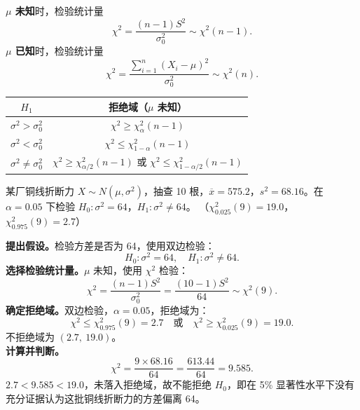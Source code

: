 ﻿\documentclass[lang=cn,11pt]{elegantbook}
\begin{document}
\begin{property}[$\chi^2$ 检验]\label{prop:chi2-test}
\textbf{\(\mu\) 未知}时，检验统计量
\[
\chi^2 = \frac{(n-1)S^2}{\sigma_0^2} \sim \chi^2(n-1).
\]
\textbf{\(\mu\) 已知}时，检验统计量
\[
\chi^2 = \frac{\sum_{i=1}^{n}(X_i-\mu)^2}{\sigma_0^2} \sim \chi^2(n).
\]
\begin{center}
\begin{tabular}{cc}
\toprule
\(H_1\) & 拒绝域（\(\mu\) 未知） \\
\midrule
\(\sigma^2 > \sigma_0^2\) & \(\chi^2 \geq \chi^2_\alpha(n-1)\) \\[4pt]
\(\sigma^2 < \sigma_0^2\) & \(\chi^2 \leq \chi^2_{1-\alpha}(n-1)\) \\[4pt]
\(\sigma^2 \neq \sigma_0^2\) & \(\chi^2 \geq \chi^2_{\alpha/2}(n-1)\) 或 \(\chi^2 \leq \chi^2_{1-\alpha/2}(n-1)\) \\
\bottomrule
\end{tabular}
\end{center}
\end{property}

\begin{exercise}\label{exer:9-chi2-two}
某厂铜线折断力 \(X \sim N(\mu, \sigma^2)\)，抽查 10 根，\(\overline{x}=575.2\)，\(s^2=68.16\)。在 \(\alpha=0.05\) 下检验 \(H_0\colon \sigma^2=64\)，\(H_1\colon \sigma^2\neq64\)。
（\(\chi^2_{0.025}(9)=19.0\)，\(\chi^2_{0.975}(9)=2.7\)）
\end{exercise}
\begin{solution}
\textbf{提出假设。}检验方差是否为 64，使用双边检验：
\[
H_0\colon \sigma^2 = 64,\quad H_1\colon \sigma^2 \neq 64.
\]
\textbf{选择检验统计量。}\(\mu\) 未知，使用 \(\chi^2\) 检验：
\[
\chi^2 = \frac{(n-1)S^2}{\sigma_0^2} = \frac{(10-1)S^2}{64} \sim \chi^2(9).
\]
\textbf{确定拒绝域。}双边检验，\(\alpha=0.05\)，拒绝域为：
\[
\chi^2 \leq \chi^2_{0.975}(9) = 2.7 \quad\text{或}\quad \chi^2 \geq \chi^2_{0.025}(9) = 19.0.
\]
不拒绝域为 \((2.7,\ 19.0)\)。\\
\textbf{计算并判断。}
\[
\chi^2 = \frac{9 \times 68.16}{64} = \frac{613.44}{64} = 9.585.
\]
\(2.7 < 9.585 < 19.0\)，未落入拒绝域，故不能拒绝 \(H_0\)，即在 5\% 显著性水平下没有充分证据认为这批铜线折断力的方差偏离 64。
\end{solution}
\end{document}
